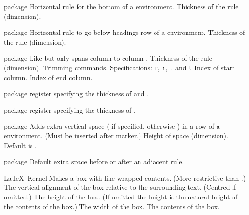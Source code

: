 %
 {}%
 { package}%
 {Horizontal rule for the bottom of a  environment.}%
 {%
   \BeginArgList
     Thickness of the rule (dimension).
   \EndArgList
 }

%
 {}%
 { package}%
 {Horizontal rule to go below headings row of a  environment.}%
 {%
   \BeginArgList
     Thickness of the rule (dimension).
   \EndArgList
 }

%
 {}%
 { package}%
 {Like  but only spans column  to column
  .}%
 {%
   \BeginArgList
     Thickness of the rule (dimension).
     Trimming commands. Specifications:
     \texttt{r}, \texttt{r}, \texttt{l} and
      \texttt{l}
     Index of start column.
     Index of end column.
   \EndArgList
 }

%
 {}%
 { package}%
 { register specifying the thickness of  and
 .}%
 {}

%
 {}%
 { package}%
 { register specifying the thickness of .}%
 {}

%
 {}%
 { package}%
 {Adds extra vertical space ( if specified, otherwise
  ) in a row of 
  a  environment. (Must be inserted after
   marker.)}%
 {%
   \BeginArgList
     Height of space (dimension). Default is
     .
   \EndArgList
 }

%
 {}%
 { package}%
 {Default extra space before or after an adjacent rule.}%
 {}

%
 {}%
 {\LaTeX\ Kernel}%
 {Makes a box with line-wrapped contents. (More restrictive than
  .)}%
 {%
   \BeginArgList
     The vertical alignment of the box relative to
     the surrounding text. (Centred if omitted.)
     The height of the box. (If omitted the
     height is the natural height of the contents of the box.)
     The width of the box.
     The contents of the box.
   \EndArgList
 }

